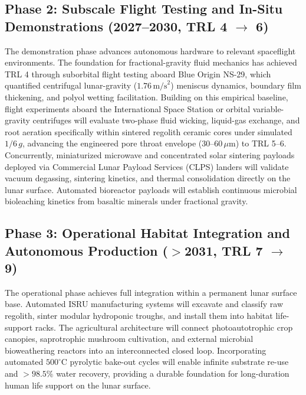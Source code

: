 \subsection{Phase 2: Subscale Flight Testing and In-Situ Demonstrations (2027--2030, \texorpdfstring{TRL 4 $\to$ 6}{TRL 4-6})}
The demonstration phase advances autonomous hardware to relevant spaceflight environments\cite{ming1989lunar,liu2013microwave,cockell2018biorock}. The foundation for fractional-gravity fluid mechanics has achieved TRL 4 through suborbital flight testing aboard Blue Origin NS-29, which quantified centrifugal lunar-gravity ($1.76\,\mathrm{m/s}^2$) meniscus dynamics, boundary film thickening, and polyol wetting facilitation\cite{hasenstein2026assessing}. Building on this empirical baseline, flight experiments aboard the International Space Station or orbital variable-gravity centrifuges will evaluate two-phase fluid wicking, liquid-gas exchange, and root aeration specifically within sintered regolith ceramic cores under simulated $1/6\,g$, advancing the engineered pore throat envelope ($30\text{--}60\,\mu\mathrm{m}$) to TRL 5--6\cite{ming1989lunar,heinse2007porous,hasenstein2026assessing}. Concurrently, miniaturized microwave and concentrated solar sintering payloads deployed via Commercial Lunar Payload Services (CLPS) landers will validate vacuum degassing, sintering kinetics, and thermal consolidation directly on the lunar surface\cite{ming1989lunar,hendrix2024reactivity,fateri2019solar}. Automated bioreactor payloads will establish continuous microbial bioleaching kinetics from basaltic minerals under fractional gravity\cite{cockell2018biorock,santomartino2023toward,cockell2020microbially}.

\subsection{Phase 3: Operational Habitat Integration and Autonomous Production (\texorpdfstring{$>$2031}{>2031}, \texorpdfstring{TRL 7 $\to$ 9}{TRL 7-9})}
The operational phase achieves full integration within a permanent lunar surface base\cite{ming1989lunar,metzger2023cost,anderson2021lunar}. Automated ISRU manufacturing systems will excavate and classify raw regolith, sinter modular hydroponic troughs, and install them into habitat life-support racks\cite{ming1989lunar,fateri2019solar,metzger2023cost}. The agricultural architecture will connect photoautotrophic crop canopies, saprotrophic mushroom cultivation, and external microbial bioweathering reactors into an interconnected closed loop\cite{ming1989lunar,grimm2018mushroom,verseux2022editorial,cockell2018biorock}. Incorporating automated $500^\circ\mathrm{C}$ pyrolytic bake-out cycles will enable infinite substrate re-use and $>98.5\%$ water recovery, providing a durable foundation for long-duration human life support on the lunar surface\cite{ming1989lunar,anderson2021lunar,barta1994thermal}.

